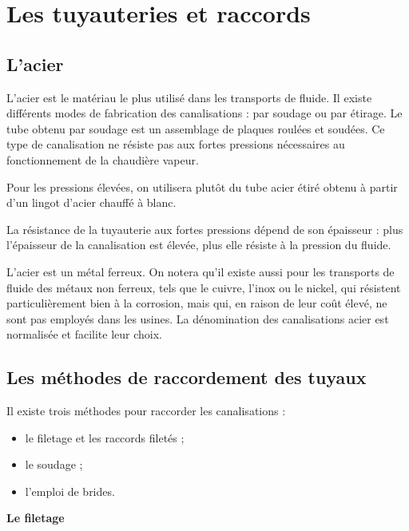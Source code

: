 \section{Les tuyauteries et raccords}

\subsection{L'acier}


L’acier est le matériau le plus utilisé dans les transports de fluide. Il existe différents modes de fabrication des canalisations : par soudage ou par étirage.
Le tube obtenu par soudage est un assemblage de plaques roulées et soudées. Ce type de canalisation ne résiste pas aux fortes pressions nécessaires au fonctionnement de la chaudière vapeur.
\vspace{0.3cm}

Pour les pressions élevées, on utilisera plutôt du tube acier étiré obtenu à partir d’un lingot d’acier chauffé à blanc.
\vspace{0.3cm}

La résistance de la tuyauterie aux fortes pressions dépend de son épaisseur : plus l’épaisseur de la canalisation est élevée, plus elle résiste à la pression du fluide.
\vspace{0.3cm}

L’acier est un métal ferreux. On notera qu’il existe aussi pour les transports de fluide des métaux non ferreux, tels que le cuivre, l’inox ou le nickel, qui résistent particulièrement bien à la corrosion, mais qui, en raison de leur coût élevé, ne sont pas employés dans les usines.
La dénomination des canalisations acier est normalisée et facilite leur choix.


\subsection{Les méthodes de raccordement des tuyaux
}

Il existe trois méthodes pour raccorder les canalisations :
\begin{itemize}
\item  le filetage et les raccords filetés ;
\item  le soudage ;
\item  l’emploi de brides.

\end{itemize}

\vspace{0.3cm}
\textbf{Le filetage}
\vspace{0.3cm}


